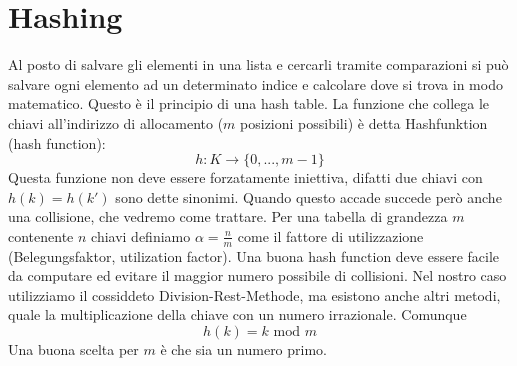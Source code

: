 \documentclass[a4paper]{book}
\begin{document}
\chapter{Hashing}
Al posto di salvare gli elementi in una lista e cercarli tramite comparazioni si può salvare ogni elemento ad un determinato indice e calcolare dove si trova in modo matematico. Questo è il principio di una hash table. La funzione che collega le chiavi all'indirizzo di allocamento ($m$ posizioni possibili) è detta Hashfunktion (hash function):
$$h: K \rightarrow \{0,..., m-1\}$$
Questa funzione non deve essere forzatamente iniettiva, difatti due chiavi con $h(k)=h(k')$ sono dette sinonimi. Quando questo accade succede però anche una collisione, che vedremo come trattare. Per una tabella di grandezza $m$ contenente $n$ chiavi definiamo $\alpha = \frac{n}{m} $ come il fattore di utilizzazione (Belegungsfaktor, utilization factor). Una buona hash function deve essere facile da computare ed evitare il maggior numero possibile di collisioni.
Nel nostro caso utilizziamo il cossiddeto Division-Rest-Methode, ma esistono anche altri metodi, quale la multiplicazione della chiave con un numero irrazionale. Comunque
$$ h(k)=k \mbox{ mod }m$$
Una buona scelta per $m$ è che sia un numero primo.
\end{document}
